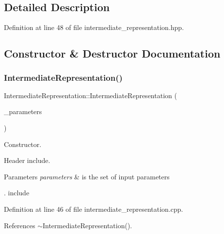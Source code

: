 \subsection{Detailed Description}


Definition at line 48 of file intermediate\+\_\+representation.\+hpp.



\subsection{Constructor \& Destructor Documentation}
\mbox{\label{classIntermediateRepresentation_adf706cd60d98eb7f72ec013d2adccc2f}} 
\subsubsection{\texorpdfstring{Intermediate\+Representation()}{IntermediateRepresentation()}}
{\footnotesize\ttfamily Intermediate\+Representation\+::\+Intermediate\+Representation (\begin{DoxyParamCaption}\item[{const \hyperlink{Parameter_8hpp_a37841774a6fcb479b597fdf8955eb4ea}{Parameter\+Const\+Ref} \&}]{\+\_\+parameters }\end{DoxyParamCaption})\hspace{0.3cm}{\ttfamily [explicit]}}



Constructor. 

Header include.


\begin{DoxyParams}{Parameters}
{\em parameters} & is the set of input parameters\\
\hline
\end{DoxyParams}
. include 

Definition at line 46 of file intermediate\+\_\+representation.\+cpp.



References $\sim$\+Intermediate\+Representation().

